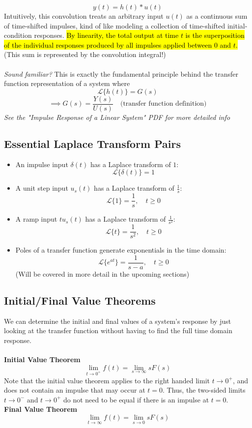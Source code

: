 ﻿\documentclass[12pt]{article}
\begin{document}
\begin{itemize}
\[
y(t)=h(t)*u(t)
\]
Intuitively, this convolution treats an arbitrary input $u(t)$ as a continuous sum of time-shifted impulses, kind of like modeling a collection of time-shifted initial-condition responses. \hl{By linearity, the total output at time $t$ is the superposition of the individual responses produced by all impulses applied between $0$ and $t$.} (This sum is represented by the convolution integral!)\\\\
\textit{Sound familiar?} This is exactly the fundamental principle behind the transfer function representation of a system where
\[\mathcal{L}\{h(t)\} = G(s)\]
\[\implies G(s) = \frac{Y(s)}{U(s)} \quad \text{(transfer function definition)}\]
\textit{See the "Impulse Response of a Linear System" PDF for more detailed info}
\end{itemize}
\subsection*{Essential Laplace Transform Pairs}
\begin{itemize}
    \item An impulse input $\delta(t)$ has a Laplace transform of $1$:
    \[\mathcal{L}\{\delta(t)\} = 1\]
    \item A unit step input $u_s(t)$ has a Laplace transform of $\frac{1}{s}$:
    \[\mathcal{L}\{1\} = \frac{1}{s}, \quad t\geq 0\]
    \item A ramp input $t u_s(t)$ has a Laplace transform of $\frac{1}{s^2}$:
    \[\mathcal{L}\{t\} = \frac{1}{s^2}, \quad t\geq 0\]
    \item Poles of a transfer function generate exponentials in the time domain:
    \[\mathcal{L}\{e^{at}\} = \frac{1}{s-a}, \quad t\geq 0\]
    (Will be covered in more detail in the upcoming sections)
\end{itemize}
\subsection*{Initial/Final Value Theorems}
We can determine the initial and final values of a system's response by just looking at the transfer function without having to find the full time domain response.\\\\
\textbf{Initial Value Theorem}
\[\boxed{\lim_{t \to {0^+}} f(t) = \lim_{s \to \infty} sF(s)}\]
Note that the initial value theorem applies to the right handed limit $t \to 0^+$, and does not contain an impulse that may occur at $t=0$. Thus, the two-sided limits $t \to 0^-$ and $t \to 0^+$ do not need to be equal if there is an impulse at $t=0$.\\
\textbf{Final Value Theorem}
\[\boxed{\lim_{t \to \infty} f(t) = \lim_{s \to 0} sF(s)}\]
\end{document}
